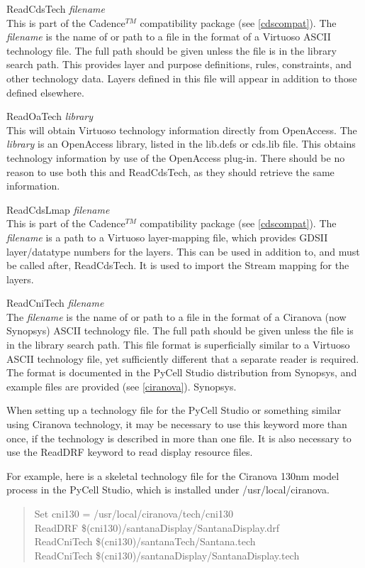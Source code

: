 \begin{description}
\item{\vt ReadCdsTech} {\it filename}\\
This is part of the Cadence$^{TM}$ compatibility package (see
\ref{cdscompat}).  The {\it filename} is the name of or path to a file
in the format of a Virtuoso ASCII technology file.  The full path
should be given unless the file is in the library search path.  This
provides layer and purpose definitions, rules, constraints, and other
technology data.  Layers defined in this file will appear in addition
to those defined elsewhere.

\ifoa
\item{\vt ReadOaTech} {\it library}\\
This will obtain Virtuoso technology information directly from
OpenAccess.  The {\it library} is an OpenAccess library, listed in
the {\vt lib.defs} or {\vt cds.lib} file.  This obtains technology
information by use of the OpenAccess plug-in.  There should be no
reason to use both this and {\vt ReadCdsTech}, as they should
retrieve the same information.
\fi

\item{\vt ReadCdsLmap} {\it filename}\\
This is part of the Cadence$^{TM}$ compatibility package (see
\ref{cdscompat}).  The {\it filename} is a path to a Virtuoso
layer-mapping file, which provides GDSII layer/datatype numbers for
the layers.  This can be used in addition to, and must be called
after, {\vt ReadCdsTech}.  It is used to import the Stream mapping
for the layers.

\item{\vt ReadCniTech} {\it filename}\\
The {\it filename} is the name of or path to a file in the format
of a Ciranova (now Synopsys) ASCII technology file.  The full path
should be given unless the file is in the library
search path.  This file format is
superficially similar to a Virtuoso ASCII technology file, yet
sufficiently different that a separate reader is required.  The
format is documented in the PyCell Studio distribution from
\ifoa
Synopsys, and example files are provided (see \ref{ciranova}).
\else
Synopsys.
\fi

When setting up a technology file for the PyCell Studio or something
similar using Ciranova technology, it may be necessary to use this
keyword more than once, if the technology is described in more than
one file.  It is also necessary to use the {\vt ReadDRF} keyword to
read display resource files.

For example, here is a skeletal technology file for the Ciranova
130nm model process in the PyCell Studio, which is installed under
{\vt /usr/local/ciranova}.

\begin{quote} \vt
Set cni130 = /usr/local/ciranova/tech/cni130\\
ReadDRF \$(cni130)/santanaDisplay/SantanaDisplay.drf\\
ReadCniTech \$(cni130)/santanaTech/Santana.tech\\
ReadCniTech \$(cni130)/santanaDisplay/SantanaDisplay.tech
\end{quote}
\end{description}

